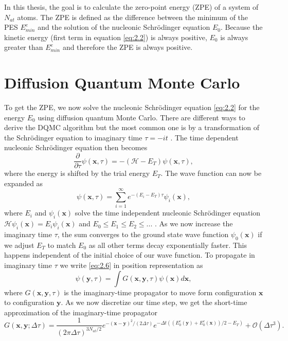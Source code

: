 \documentclass [12pt]{report}
\begin{document}
In this thesis, the goal is to calculate the zero-point energy (ZPE) of a system of $N_{at}$ atoms. The ZPE is defined as the difference between the minimum of the PES $E_{min}^e$ and the solution of the nucleonic Schrödinger equation $E_0$. Because the kinetic energy (first term in equation \eqref{eq:2.2}) is always positive, $E_0$ is always greater than $E_{min}^e$ and therefore the ZPE is always positive.

\section{Diffusion Quantum Monte Carlo}
To get the ZPE, we now solve the nucleonic Schrödinger equation \eqref{eq:2.2} for the energy $E_0$ using diffusion quantum Monte Carlo. There are different ways to derive the DQMC algorithm but the most common one is by a transformation of the Schrödinger equation to imaginary time $\tau = -it$ \cite{mccoy,cyrus,herleitung2}. The time dependent nucleonic Schrödinger equation then becomes
\begin{equation} \label{eq:2.5}
\frac{\partial}{\partial \tau} \psi(\bm{x},\tau) = -(\mathcal{H} - E_T) \psi(\bm{x},\tau),
\end{equation}
where the energy is shifted by the trial energy $E_T$. The wave function can now be expanded as
\begin{equation} \label{eq:2.6}
\psi(\bm{x},\tau) = \sum_{i=1}^{\infty} e^{-(E_i - E_T)\tau}\psi_i(\bm{x}),
\end{equation}
where $E_i$ and $\psi_i(\bm{x})$ solve the time independent nucleonic Schrödinger equation $\mathcal{H}\psi_i(\bm{x}) = E_i \psi_i(\bm{x})$ and $E_0 \leq E_1 \leq E_2 \leq...$ .
As we now increase the imaginary time $\tau$, the sum converges to the ground state wave function $\psi_0(\bm{x})$ if we adjust $E_T$ to match $E_0$ as all other terms decay exponentially faster. This happens independent of the initial choice of our wave function.
To propagate in imaginary time $\tau$ we write \eqref{eq:2.6} in position representation as
\begin{equation} \label{propagate}
\psi(\bm{y},\tau) = \int G(\bm{x},\bm{y},\tau) \psi(\bm{x}) d \bm{x},
\end{equation}
where $G(\bm{x},\bm{y},\tau)$ is the imaginary-time propagator to move form configuration $\bm{x}$ to configuration $\bm{y}$. 
As we now discretize our time step, we get the short-time approximation of the imaginary-time  propagator 
\begin{equation} \label{eq:2.7}
G(\bm{x},\bm{y};\Delta \tau) = \frac{1}{(2 \pi \Delta \tau)^{3N_{at}/2}} e^{-(\bm{x}-\bm{y})^2 /(2 \Delta \tau)} e^{-\Delta t ((E_0^e(\bm{y})+E_0^e(\bm{x}))/2 - E_T)} + \mathcal{O}(\Delta \tau^3).
\end{equation}
\end{document}

